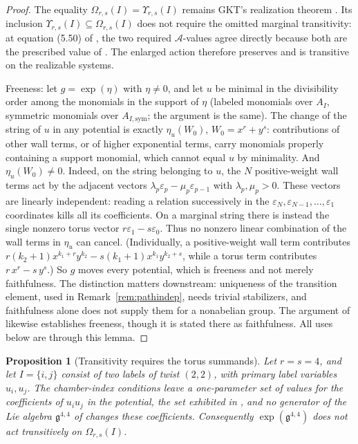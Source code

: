 \documentclass[11pt]{amsart}
\newtheorem{proposition}[theorem]{Proposition}
\theoremstyle{definition}
\theoremstyle{remark}
\newcommand{\gfrak}{\mathfrak{g}}
\newcommand{\Ascr}{\mathcal{A}}
\newcommand{\Om}{\Omega_{r,s}}
\begin{document}
\begin{proof}
The equality $\Om(I)=\Upsilon_{r,s}(I)$ remains GKT's realization theorem
\cite[Thm.~5.13 and Cor.~5.14]{GKT}.  Its inclusion
$\Upsilon_{r,s}(I)\subseteq\Om(I)$ does not require the omitted marginal
transitivity: at equation (5.50) of \cite{GKT}, the two required
$\Ascr$-values agree directly because both are the prescribed value of
\cite[Def.~3.47]{GKT}.  The enlarged action therefore preserves and is
transitive on the realizable systems.

Freeness: let $g=\exp(\eta)$ with $\eta\ne0$, and let $u$ be minimal in the
divisibility order among the monomials in the support of $\eta$ (labeled
monomials over $A_I$, symmetric monomials over $A_{I,\mathrm{sym}}$; the
argument is the same). The change of
the string of $u$ in any potential is exactly $\eta_{u}(W_{0})$, $W_{0}=x^{r}+y^{s}$: contributions of
other wall terms, or of higher exponential terms, carry monomials properly
containing a support monomial, which cannot equal $u$ by minimality. And
$\eta_{u}(W_{0})\ne0$. Indeed, on the string belonging to $u$, the $N$
positive-weight wall terms act by the adjacent vectors
$\lambda_{p}\varepsilon_{p}-\mu_{p}\varepsilon_{p-1}$ with $\lambda_{p},\mu_{p}>0$. These
vectors are linearly independent: reading a relation successively in the
$\varepsilon_{N},\varepsilon_{N-1},\ldots,\varepsilon_{1}$ coordinates kills all its
coefficients. On a marginal string there is instead the single nonzero torus
vector $r\varepsilon_{1}-s\varepsilon_{0}$. Thus no nonzero linear combination of the wall terms in
$\eta_u$ can cancel. (Individually, a positive-weight wall term contributes
$r(k_{2}{+}1)x^{k_{1}+r}y^{k_{2}}-s(k_{1}{+}1)x^{k_{1}}y^{k_{2}+s}$, while a
torus term contributes $r\,x^{r}-s\,y^{s}$.) So $g$ moves every potential, which is freeness and not
merely faithfulness. The distinction matters downstream: uniqueness of the
transition element, used in Remark~\ref{rem:pathindep}, needs trivial
stabilizers, and faithfulness alone does not supply them for a nonabelian group.
The argument of \cite[Thm.~4.27, Step~2]{GKT} likewise establishes freeness,
though it is stated there as faithfulness. All uses below are through this lemma.
\end{proof}

\begin{proposition}[Transitivity requires the torus summands]
\label{prop:nontransitive}
Let $r=s=4$, and let $I=\{i,j\}$ consist of two labels of twist $(2,2)$, with
primary label variables $u_i,u_j$.  The chamber-index conditions leave a
one-parameter set of values for the coefficients of $u_iu_j$ in the
potential, the set exhibited in \cite[Ex.~4.9]{GKTsurvey}, and no generator of the
Lie algebra $\gfrak^{4,4}$ of \cite[Def.~4.23]{GKT} changes these
coefficients.  Consequently $\exp(\gfrak^{4,4})$ does not act transitively on
$\Om(I)$.
\end{proposition}
\end{document}
